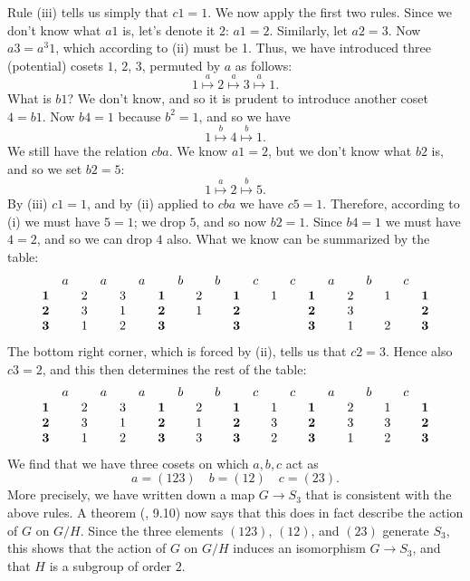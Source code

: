 \documentclass[a4paper,11pt,final]{memoir}%
\theoremstyle{nonumberplain}
\begin{document}
Rule (iii) tells us simply that $c1=1$. We now apply the first two rules.
Since we don't know what $a1$ is, let's denote it $2$: $a1=2$. Similarly, let
$a2=3$. Now $a3=a^{3}1$, which according to (ii) must be 1. Thus, we have
introduced three (potential) cosets $1$, $2$, $3$, permuted by $a$ as
follows:
\[
1\overset{a}{\mapsto}2\overset{a}{\mapsto}3\overset{a}{\mapsto}1.
\]
What is $b1$? We don't know, and so it is prudent to introduce another coset
$4=b1$. Now $b4=1$ because $b^{2}=1$, and so we have
\[
1\overset{b}{\mapsto}4\overset{b}{\mapsto}1.
\]
We still have the relation $cba$. We know $a1=2$, but we don't know what $b2$
is, and so we set $b2=5$:%
\[
1\overset{a}{\mapsto}2\overset{b}{\mapsto}5.
\]
By (iii) $c1=1$, and by (ii) applied to $cba$ we have $c5=1$. Therefore,
according to (i) we must have $5=1$; we drop $5$, and so now $b2=1$. Since
$b4=1$ we must have $4=2$, and so we can drop $4$ also. What we know can be
summarized by the table:
\[%
\begin{array}
[c]{ccccccccccccccccccccc}
& a &  & a &  & a &  & b &  & b &  & c &  & c &  & a &  & b &  & c & \\
\mathbf{1} &  & 2 &  & 3 &  & \mathbf{1} &  & 2 &  & \mathbf{1} &  & 1 &  &
\mathbf{1} &  & 2 &  & 1 &  & \mathbf{1}\\
\mathbf{2} &  & 3 &  & 1 &  & \mathbf{2} &  & 1 &  & \mathbf{2} &  &  &  &
\mathbf{2} &  & 3 &  &  &  & \mathbf{2}\\
\mathbf{3} &  & 1 &  & 2 &  & \mathbf{3} &  &  &  & \mathbf{3} &  &  &  &
\mathbf{3} &  & 1 &  & 2 &  & \mathbf{3}%
\end{array}
\]
The bottom right corner, which is forced by (ii), tells us that $c2=3$. Hence
also $c3=2$, and this then determines the rest of the table:
\[%
\begin{array}
[c]{ccccccccccccccccccccc}
& a &  & a &  & a &  & b &  & b &  & c &  & c &  & a &  & b &  & c & \\
\mathbf{1} &  & 2 &  & 3 &  & \mathbf{1} &  & 2 &  & \mathbf{1} &  & 1 &  &
\mathbf{1} &  & 2 &  & 1 &  & \mathbf{1}\\
\mathbf{2} &  & 3 &  & 1 &  & \mathbf{2} &  & 1 &  & \mathbf{2} &  & 3 &  &
\mathbf{2} &  & 3 &  & 3 &  & \mathbf{2}\\
\mathbf{3} &  & 1 &  & 2 &  & \mathbf{3} &  & 3 &  & \mathbf{3} &  & 2 &  &
\mathbf{3} &  & 1 &  & 2 &  & \mathbf{3}%
\end{array}
\]
We find that we have three cosets on which $a,b,c$ act as
\[
a=(123)\quad b=(12)\quad c=(23).
\]
More precisely, we have written down a map $G\rightarrow S_{3}$ that is
consistent with the above rules. A theorem (\cite{artin1991}, 9.10) now says
that this does in fact describe the action of $G$ on $G/H$. Since the three
elements $(123)$, $(12)$, and $(23)$ generate $S_{3}$, this shows that the
action of $G$ on $G/H$ induces an isomorphism $G\rightarrow S_{3}$, and that
$H$ is a subgroup of order $2$.
\end{document}
